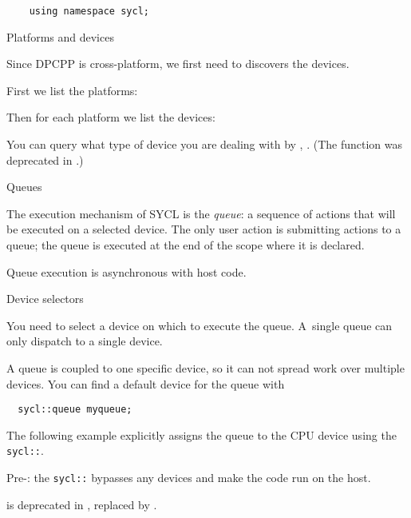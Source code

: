 \begin{dpcppnote}
  \begin{lstlisting}
    using namespace sycl;
  \end{lstlisting}
\end{dpcppnote}

 {Platforms and devices}

Since \ac{DPCPP} is cross-platform, we first need to discovers
the devices.

First we list the platforms:

Then for each platform we list the devices:

You can query what type of device you are dealing with by
, .
(The function  was deprecated
in .)

 {Queues}

The execution mechanism of SYCL is the
\emph{queue}:
a sequence of actions that will be executed on a selected device.
The only user action is submitting actions to a queue;
the queue is executed at the end of the scope where it is declared.

Queue execution is asynchronous with host code.

 {Device selectors}

You need to select a device on which to execute the queue.
A~single queue can only dispatch to a single device.

A queue is coupled to one specific device,
so it can not spread work over multiple devices.
You can find a default device for the queue with
\begin{lstlisting}
  sycl::queue myqueue;
\end{lstlisting}

The following example explicitly assigns the queue to the CPU device
using the \lstinline+sycl::+.

\begin{remark}
  Pre-:
  the \lstinline+sycl::+ bypasses any devices and
  make the code run on the host.

   is deprecated in ,
  replaced by .
\end{remark}

